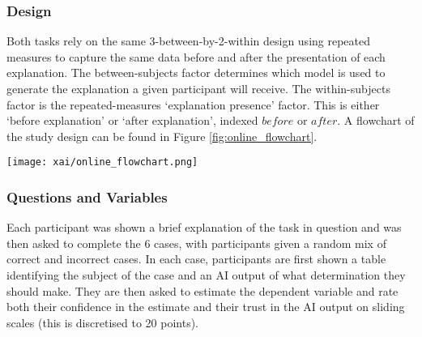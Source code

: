 \subsubsection{Design}
Both tasks rely on the same 3-between-by-2-within design using repeated measures to capture the same data before and after the presentation of each explanation. The between-subjects factor determines which model is used to generate the explanation a given participant will receive. The within-subjects factor is the repeated-measures `explanation presence' factor. This is either `before explanation' or `after explanation', indexed $before$ or $after$. A flowchart of the study design can be found in Figure \ref{fig:online_flowchart}.

\begin{figure*}[htbp]
    \centering
    \texttt{[image: xai/online\_flowchart.png]}
    \caption{Participants in the online study are sorted into six buckets, where each bucket is segregated by explanatory condition and task and shown a brief description of the task (i.e., each participant sees only one of the explanations in Figure \ref{fig:online_explanations}). Then, each participant is shown 6 cases. In each case, participants are shown an applicant profile and an AI output. Participants are asked to agree or disagree with the AI output. Then, participants are given explanations based on their explanatory condition scores. They are then asked again to agree or disagree with the AI output.}
    \label{fig:online_flowchart}
\end{figure*}


\subsubsection{Questions and Variables}\label{sssec:q_and_v}
Each participant was shown a brief explanation of the task in question and was then asked to complete the 6 cases, with participants given a random mix of correct and incorrect cases. In each case, participants are first shown a table identifying the subject of the case and an AI output of what determination they should make. They are then asked to estimate the dependent variable and rate both their confidence in the estimate and their trust in the AI output on sliding scales (this is discretised to 20 points).

